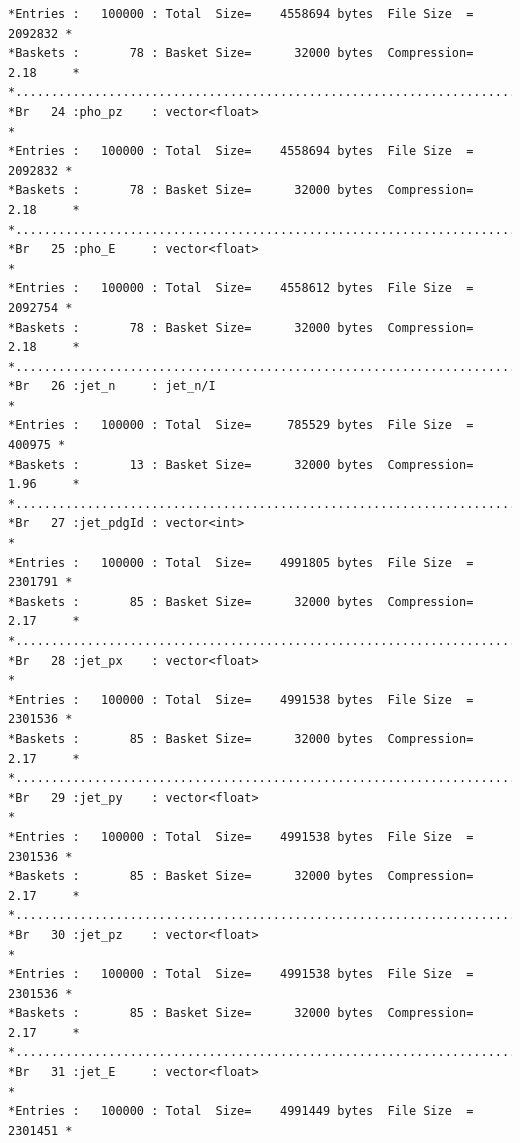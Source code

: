 {\begin{verbatim}
*Entries :   100000 : Total  Size=    4558694 bytes  File Size  =    2092832 *
*Baskets :       78 : Basket Size=      32000 bytes  Compression=   2.18     *
*............................................................................*
*Br   24 :pho_pz    : vector<float>                                          *
*Entries :   100000 : Total  Size=    4558694 bytes  File Size  =    2092832 *
*Baskets :       78 : Basket Size=      32000 bytes  Compression=   2.18     *
*............................................................................*
*Br   25 :pho_E     : vector<float>                                          *
*Entries :   100000 : Total  Size=    4558612 bytes  File Size  =    2092754 *
*Baskets :       78 : Basket Size=      32000 bytes  Compression=   2.18     *
*............................................................................*
*Br   26 :jet_n     : jet_n/I                                                *
*Entries :   100000 : Total  Size=     785529 bytes  File Size  =     400975 *
*Baskets :       13 : Basket Size=      32000 bytes  Compression=   1.96     *
*............................................................................*
*Br   27 :jet_pdgId : vector<int>                                            *
*Entries :   100000 : Total  Size=    4991805 bytes  File Size  =    2301791 *
*Baskets :       85 : Basket Size=      32000 bytes  Compression=   2.17     *
*............................................................................*
*Br   28 :jet_px    : vector<float>                                          *
*Entries :   100000 : Total  Size=    4991538 bytes  File Size  =    2301536 *
*Baskets :       85 : Basket Size=      32000 bytes  Compression=   2.17     *
*............................................................................*
*Br   29 :jet_py    : vector<float>                                          *
*Entries :   100000 : Total  Size=    4991538 bytes  File Size  =    2301536 *
*Baskets :       85 : Basket Size=      32000 bytes  Compression=   2.17     *
*............................................................................*
*Br   30 :jet_pz    : vector<float>                                          *
*Entries :   100000 : Total  Size=    4991538 bytes  File Size  =    2301536 *
*Baskets :       85 : Basket Size=      32000 bytes  Compression=   2.17     *
*............................................................................*
*Br   31 :jet_E     : vector<float>                                          *
*Entries :   100000 : Total  Size=    4991449 bytes  File Size  =    2301451 *

\end{verbatim}}
